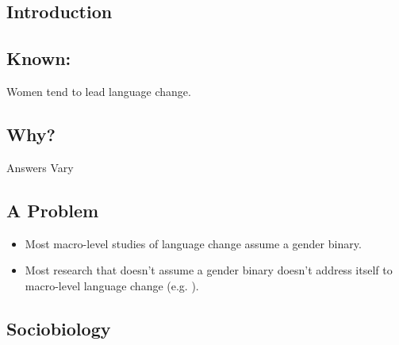 \documentclass[a0,portrait]{a0poster}
\begin{document}
\begin{multicols}{2} %


\section*{Introduction}

\color{Navy} %
\subsection*{Known:}
\Large
Women tend to lead language change.

\color{SaddleBrown}
\subsection*{Why?}

Answers Vary

\color{Navy}
\subsection*{A Problem}

\begin{itemize}
	\item Most macro-level studies of language change assume a gender binary.
	\item Most research that doesn't assume a gender binary doesn't address itself to macro-level language change (e.g. \citet{zimmanetal2014}).
\end{itemize}



\color{DarkSlateGray} %
\subsection*{Sociobiology}


\end{multicols}
\end{document}
